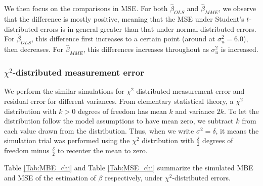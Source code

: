 \documentclass{article}
\begin{document}
We then focus on the comparisons in MSE.
For both $\hat{\beta}_{OLS}$ and $\hat{\beta}_{MME}$, we observe that the difference is mostly positive,
meaning that the MSE under Student's $t$-distributed errors is in general greater than that under normal-distributed errors.
For $\hat{\beta}_{OLS}$, this difference first increases to a certain point (around at $\sigma^2_u = 6.0$), then decreases.
For $\hat{\beta}_{MME}$, this differences increases throughout as $\sigma^2_u$ is increased.

\subsubsection{$\chi^2$-distributed measurement error}

We perform the similar simulations for $\chi^2$ distributed measurement error and residual error for different variances.
From elementary statistical theory, a $\chi^2$ distribution with $k > 0$ degrees of freedom has mean $k$ and variance $2k$.
To let the distribution follow the model assumptions to have mean zero, we subtract $k$ from each value drawn from the distribution.
Thus, when we write $\sigma^2 = \delta$, it means the simulation trial was performed using the $\chi^2$ distribution with $\frac{\delta}{2}$ degrees of freedom minus $\frac{\delta}{2}$ to recenter the mean to zero.

Table \ref{Tab:MBE_chi} and Table \ref{Tab:MSE_chi} summarize the simulated MBE and MSE of the estimation of $\beta$ respectively, under $\chi^2$-distributed errors.
\end{document}
